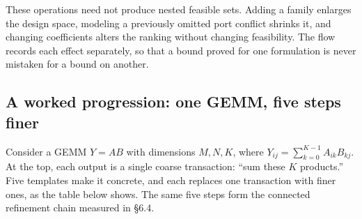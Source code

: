 \documentclass[11pt]{article}
\begin{document}
These operations need not produce nested feasible sets. Adding a family enlarges the design space, modeling a previously omitted port conflict shrinks it, and changing coefficients alters the ranking without changing feasibility. The flow records each effect separately, so that a bound proved for one formulation is never mistaken for a bound on another.

\hypertarget{a-worked-progression-one-gemm-five-steps-finer}{%
\subsection{A worked progression: one GEMM, five steps finer}\label{a-worked-progression-one-gemm-five-steps-finer}}

Consider a GEMM \(Y=AB\) with dimensions \(M,N,K\), where \(Y_{ij}=\sum_{k=0}^{K-1}A_{ik}B_{kj}\). At the top, each output is a single coarse transaction: ``sum these \(K\) products.'' Five templates make it concrete, and each replaces one transaction with finer ones, as the table below shows. The same five steps form the connected refinement chain measured in §6.4.
\end{document}
